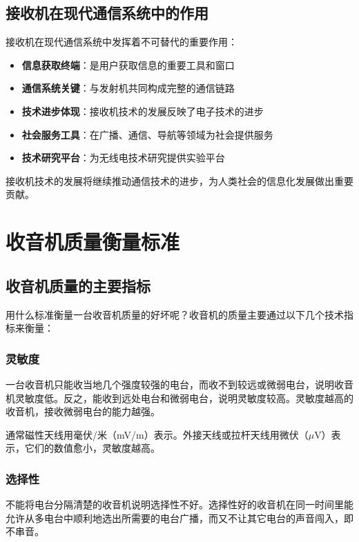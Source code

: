 \documentclass[12pt,UTF8]{ctexbook}
\begin{document}
\section{接收机在现代通信系统中的作用}

接收机在现代通信系统中发挥着不可替代的重要作用：

\begin{itemize}[leftmargin=3.5em]
    \item \textbf{信息获取终端}：是用户获取信息的重要工具和窗口
    \item \textbf{通信系统关键}：与发射机共同构成完整的通信链路
    \item \textbf{技术进步体现}：接收机技术的发展反映了电子技术的进步
    \item \textbf{社会服务工具}：在广播、通信、导航等领域为社会提供服务
    \item \textbf{技术研究平台}：为无线电技术研究提供实验平台
\end{itemize}

接收机技术的发展将继续推动通信技术的进步，为人类社会的信息化发展做出重要贡献。

\chapter{收音机质量衡量标准}

\section{收音机质量的主要指标}

用什么标准衡量一台收音机质量的好坏呢？收音机的质量主要通过以下几个技术指标来衡量：

\subsection{灵敏度}

一台收音机只能收当地几个强度较强的电台，而收不到较远或微弱电台，说明收音机灵敏度低。反之，能收到远处电台和微弱电台，说明灵敏度较高。灵敏度越高的收音机，接收微弱电台的能力越强。

通常磁性天线用毫伏/米（mV/m）表示。外接天线或拉杆天线用微伏（$\mu$V）表示，它们的数值愈小，灵敏度越高。

\subsection{选择性}

不能将电台分隔清楚的收音机说明选择性不好。选择性好的收音机在同一时间里能允许从多电台中顺利地选出所需要的电台广播，而又不让其它电台的声音闯入，即不串音。
\end{document}
